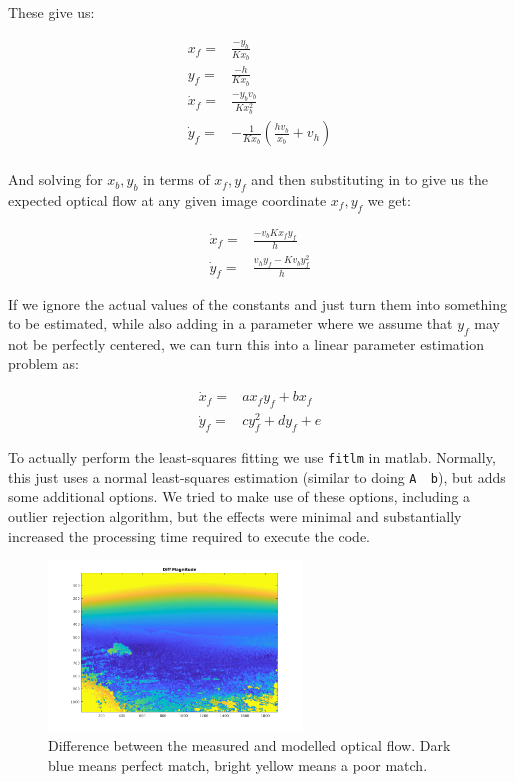 \documentclass{article}
\begin{document}
These give us:

\begin{align*}
x_f =& \frac{-y_b}{Kx_b} \\
y_f =& \frac{-h}{Kx_b} \\
\dot{x}_f =& \frac{-y_bv_b}{Kx^2_b} \\
\dot{y}_f =& -\frac{1}{Kx_b}(\frac{hv_b}{x_b} + v_h) \\
\end{align*}

And solving for $x_b, y_b$ in terms of $x_f, y_f$ and then substituting in to
give us the expected optical flow at any given image coordinate $x_f, y_f$ we
get:

\begin{align}
\dot{x}_f =& \frac{-v_bKx_fy_f}{h} \\
\dot{y}_f =& \frac{v_hy_f - Kv_by_f^2}{h}
\end{align}

If we ignore the actual values of the constants and just turn them into
something to be estimated, while also adding in a parameter where we
assume that $y_f$ may not be perfectly centered, we can turn this into a
linear parameter estimation problem as:

\begin{align}
\dot{x}_f =& ax_fy_f + bx_f \\
\dot{y}_f =& cy_f^2 + dy_f + e
\end{align}

To actually perform the least-squares fitting we use \texttt{fitlm} in
matlab. Normally, this just uses a normal least-squares estimation
(similar to doing \texttt{A \ b}), but adds some additional
options. We tried to make use of these options, including a outlier
rejection algorithm, but the effects were minimal and substantially
increased the processing time required to execute the code.

\begin{figure}
\centering
\includegraphics[width=0.6\textwidth]{diff_magnitude}
\caption{Difference between the measured and modelled optical flow.
         Dark blue means perfect match, bright yellow means a poor match.}
\label{fig:diff_magnitude}
\end{figure}
\end{document}
